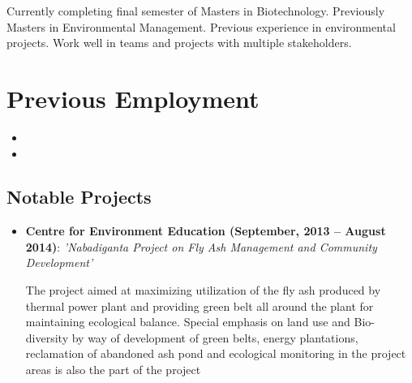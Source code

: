 \documentclass[11pt,a4paper,sans]{moderncv}
\title{}                               %
\begin{document}
\makecvtitle

\small{Currently completing final semester of Masters in Biotechnology. Previously Masters in Environmental Management. Previous experience in environmental projects. Work well in teams and projects with multiple stakeholders.}

\section{Previous Employment}

\vspace{6pt}

\begin{itemize}

\item{}

\vspace{6pt}

\item{}

\end{itemize}

\subsection{Notable Projects}
\begin{itemize}
\item{\textbf{Centre for Environment Education (September, 2013 – August 2014)}: \textit{'Nabadiganta Project on Fly Ash Management and Community Development'}

      \vspace{3pt}

The project aimed at maximizing utilization of the fly ash produced by thermal power plant and providing green belt all around the plant
for maintaining ecological balance. Special emphasis on land use and Bio-diversity by way of development of green belts, energy plantations,
reclamation of abandoned ash pond and ecological monitoring in the project areas is also the part of the project}
\end{itemize}
\end{document}
